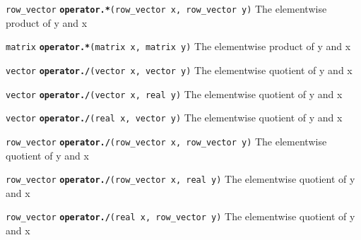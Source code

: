 \documentclass[
  10pt,
]{book}
\begin{document}

\texttt{row\_vector} \textbf{\texttt{operator.*}}\texttt{(row\_vector\ x,\ row\_vector\ y)}\newline
The elementwise product of y and x


\texttt{matrix} \textbf{\texttt{operator.*}}\texttt{(matrix\ x,\ matrix\ y)}\newline
The elementwise product of y and x


\texttt{vector} \textbf{\texttt{operator./}}\texttt{(vector\ x,\ vector\ y)}\newline
The elementwise quotient of y and x


\texttt{vector} \textbf{\texttt{operator./}}\texttt{(vector\ x,\ real\ y)}\newline
The elementwise quotient of y and x


\texttt{vector} \textbf{\texttt{operator./}}\texttt{(real\ x,\ vector\ y)}\newline
The elementwise quotient of y and x


\texttt{row\_vector} \textbf{\texttt{operator./}}\texttt{(row\_vector\ x,\ row\_vector\ y)}\newline
The elementwise quotient of y and x


\texttt{row\_vector} \textbf{\texttt{operator./}}\texttt{(row\_vector\ x,\ real\ y)}\newline
The elementwise quotient of y and x


\texttt{row\_vector} \textbf{\texttt{operator./}}\texttt{(real\ x,\ row\_vector\ y)}\newline
The elementwise quotient of y and x
\end{document}
